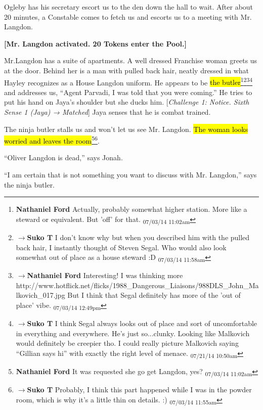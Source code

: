 Ogleby has his secretary escort us to the den down the hall to wait.  After about 20 minutes, a Constable comes to fetch us and escorts us to a meeting with Mr. Langdon.



\textbf{{[}Mr. Langdon activated.  20 Tokens enter the Pool.{]}}



Mr.Langdon has a suite of apartments.  A well dressed Franchise woman greets us at the door.  Behind her is a man with pulled back hair, neatly dressed in what Hayley recognizes as a House Langdon uniform.  He appears to be \hl{the butler}\footnote{\textbf{Nathaniel Ford }Actually, probably somewhat higher station. More like a steward or equivalent. But 'off' for that. \textsubscript{07/03/14 11:02am}}\footnote{$\rightarrow$\textbf{Suko T }I don't know why but when you described him with the pulled back hair, I instantly thought of Steven Segal.  Who would also look somewhat out of place as a house steward :D \textsubscript{07/03/14 11:58am}}\footnote{$\rightarrow$\textbf{Nathaniel Ford }Interesting! I was thinking more http://www.hotflick.net/flicks/1988\_Dangerous\_Liaisons/988DLS\_John\_Malkovich\_017.jpg But I think that Segal definitely has more of the 'out of place' vibe. \textsubscript{07/03/14 12:49pm}}\footnote{$\rightarrow$\textbf{Suko T }I think Segal always looks out of place and sort of uncomfortable in everything and everywhere.  He's just so...clunky.  Looking like Malkovich would definitely be creepier tho.  I could really picture Malkovich saying ``Gillian says hi'' with exactly the right level of menace. \textsubscript{07/21/14 10:50am}} and addresses us, ``Agent Parvadi, I was told that you were coming.''  He tries to put his hand on Jaya's shoulder but she ducks him. {[}\textit{Challenge 1: Notice. Sixth Sense 1 (Jaya) → Matched}{]}  Jaya senses that he is combat trained. 



The ninja butler stalls us and won't let us see Mr. Langdon.  \hl{The woman looks worried and leaves the room}\footnote{\textbf{Nathaniel Ford }It was requested she go get Langdon, yes? \textsubscript{07/03/14 11:02am}}\footnote{$\rightarrow$\textbf{Suko T }Probably, I think this part happened while I was in the powder room, which is why it's a little thin on details. :) \textsubscript{07/03/14 11:55am}}.  

``Oliver Langdon is dead,'' says Jonah.

``I am certain that is not something you want to discuss with Mr. Langdon,'' says the ninja butler.

